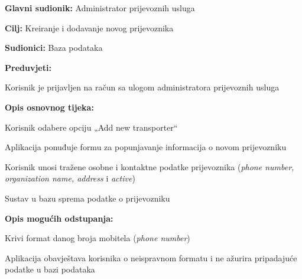 					
					\noindent {}
					\begin{packed_item}
						\item \textbf{Glavni sudionik:} Administrator prijevoznih usluga
						\item  \textbf{Cilj:} Kreiranje i dodavanje novog prijevoznika
						\item  \textbf{Sudionici:} Baza podataka
						\item  \textbf{Preduvjeti:}
						\item[] \begin{packed_enum}
							\item Korisnik je prijavljen na račun sa ulogom administratora prijevoznih usluga
						\end{packed_enum}
						
						\item  \textbf{Opis osnovnog tijeka:}
						\item[] \begin{packed_enum}
							\item Korisnik odabere opciju „Add new transporter“
							\item Aplikacija ponuđuje formu za popunjavanje informacija o novom prijevozniku
							\item Korisnik unosi tražene osobne i kontaktne podatke prijevoznika (\textit{phone number, organization name, address} i \textit{active})
							\item Sustav u bazu sprema podatke o prijevozniku
						\end{packed_enum}
						
						\item  \textbf{Opis mogućih odstupanja:}
						\item[] \begin{packed_item}
							\item[3.a] Krivi format danog broja mobitela (\textit{phone number})
							\item[] \begin{packed_enum}
								\item Aplikacija obavještava korisnika o neispravnom formatu i ne ažurira pripadajuće podatke u bazi podataka
							\end{packed_enum}
						\end{packed_item}
					\end{packed_item}
					
